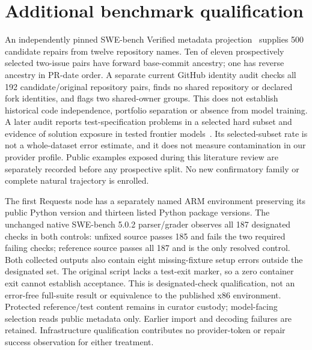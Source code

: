 \section{Additional benchmark qualification}
\label{sec:incremental-recruitment}
An independently pinned SWE-bench Verified metadata projection~\citep{swebench2024,swebenchverified2024} supplies 500
candidate repairs from twelve repository names. Ten of eleven prospectively
selected two-issue pairs have forward base-commit ancestry; one has reverse
ancestry in PR-date order. A separate current GitHub identity audit checks all
192 candidate/original repository pairs, finds no shared repository or declared
fork identities, and flags two shared-owner groups. This does not establish
historical code independence, portfolio separation or absence from model
training. A later audit reports test-specification problems in a selected hard
subset and evidence of solution exposure in tested frontier models~\citep{swebenchverifiedaudit2026}.
Its selected-subset rate is not a whole-dataset error estimate, and it does not
measure contamination in our provider profile. Public examples exposed during
this literature review are separately recorded before any prospective split.
No new confirmatory family or complete natural trajectory is enrolled.

The first Requests node has a separately named ARM environment preserving its
public Python version and thirteen listed Python package versions. The unchanged
native SWE-bench 5.0.2 parser/grader observes all 187 designated checks in both
controls: unfixed source passes 185 and fails the two required failing checks;
reference source passes all 187 and is the only resolved control. Both collected
outputs also contain eight missing-fixture setup errors outside the designated
set. The original script lacks a test-exit marker, so a zero container exit
cannot establish acceptance. This is designated-check qualification, not an
error-free full-suite result or equivalence to the published x86 environment.
Protected reference/test content remains in curator custody; model-facing
selection reads public metadata only. Earlier import and decoding failures are
retained. Infrastructure qualification contributes no provider-token or repair
success observation for either treatment.


